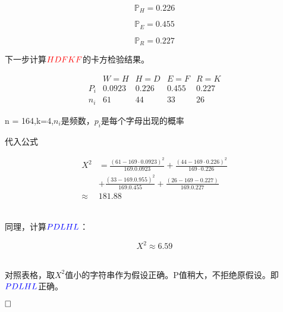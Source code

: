 \documentclass{article}
\begin{document}
$$\mathbb{P}_H =0.226$$

$$\mathbb{P}_E =0.455$$

$$\mathbb{P}_R =0.227$$

下一步计算\textbf{$\color{red}{HDFKF}$}的卡方检验结果。

$$
\begin{array}{c|c|c|c|c} 
& W=H & H=D & E=F & R=K \\
\hline P_{i} & 0.0923 & 0.226 & 0.455 & 0.227 \\
\hline n_{i} & 61 & 44 & 33 & 26
\end{array}
$$

n = 164,k=4,$n_i$是频数，$p_i$是每个字母出现的概率

代入公式

$$
\begin{aligned}
X^{2} &=\frac{(61-169 \cdot 0.0923)^{2}}{169.0 .0923}+\frac{(44-169 \cdot 0.226)^{2}}{169 \cdot 0.226} \\
&+\frac{(33-169.0 .955)^{2}}{169.0 .455}+\frac{(26-169-0.227)}{169.0 .227} \\
\approx & 181.88
\end{aligned}
$$

~\\

同理，计算\textbf{$\color{blue}{PDLHL}$}：

$$
X^{2} \approx 6.59
$$

~\\

对照表格，取$X^2$值小的字符串作为假设正确。P值稍大，不拒绝原假设。即\textbf{$\color{blue}{PDLHL}$}正确。

$\hfill\square$ 
\end{document}
